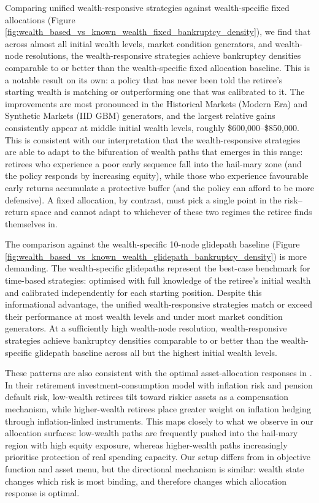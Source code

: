 \documentclass[11pt]{article}
\begin{document}
Comparing unified wealth-responsive strategies against wealth-specific fixed allocations (Figure \ref{fig:wealth_based_vs_known_wealth_fixed_bankruptcy_density}), we find that across almost all initial wealth levels, market condition generators, and wealth-node resolutions, the wealth-responsive strategies achieve bankruptcy densities comparable to or better than the wealth-specific fixed allocation baseline. This is a notable result on its own: a policy that has never been told the retiree's starting wealth is matching or outperforming one that was calibrated to it. The improvements are most pronounced in the Historical Markets (Modern Era) and Synthetic Markets (IID GBM) generators, and the largest relative gains consistently appear at middle initial wealth levels, roughly \$600,000--\$850,000. This is consistent with our interpretation that the wealth-responsive strategies are able to adapt to the bifurcation of wealth paths that emerges in this range: retirees who experience a poor early sequence fall into the hail-mary zone (and the policy responds by increasing equity), while those who experience favourable early returns accumulate a protective buffer (and the policy can afford to be more defensive). A fixed allocation, by contrast, must pick a single point in the risk--return space and cannot adapt to whichever of these two regimes the retiree finds themselves in.

The comparison against the wealth-specific 10-node glidepath baseline (Figure \ref{fig:wealth_based_vs_known_wealth_glidepath_bankruptcy_density}) is more demanding. The wealth-specific glidepaths represent the best-case benchmark for time-based strategies: optimised with full knowledge of the retiree's initial wealth and calibrated independently for each starting position. Despite this informational advantage, the unified wealth-responsive strategies match or exceed their performance at most wealth levels and under most market condition generators. At a sufficiently high wealth-node resolution, wealth-responsive strategies achieve bankruptcy densities comparable to or better than the wealth-specific glidepath baseline across all but the highest initial wealth levels.

These patterns are also consistent with the optimal asset-allocation responses in \textcite{lin2024optimal}. In their retirement investment-consumption model with inflation risk and pension default risk, low-wealth retirees tilt toward riskier assets as a compensation mechanism, while higher-wealth retirees place greater weight on inflation hedging through inflation-linked instruments. This maps closely to what we observe in our allocation surfaces: low-wealth paths are frequently pushed into the hail-mary region with high equity exposure, whereas higher-wealth paths increasingly prioritise protection of real spending capacity. Our setup differs from \textcite{lin2024optimal} in objective function and asset menu, but the directional mechanism is similar: wealth state changes which risk is most binding, and therefore changes which allocation response is optimal.
\end{document}
